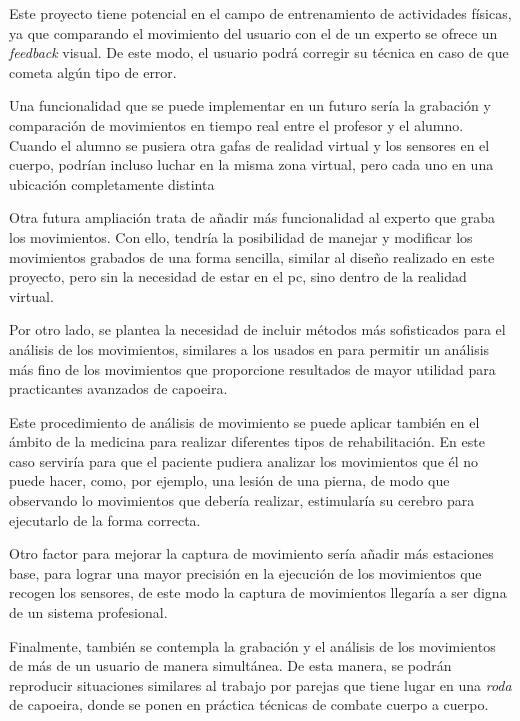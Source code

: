 Este proyecto tiene potencial en el campo de entrenamiento de actividades físicas, ya que comparando el movimiento del usuario con el de un experto se ofrece un \textit{feedback} visual. De este modo, el usuario podrá corregir su técnica en caso de que cometa algún tipo de error. 

Una funcionalidad que se puede implementar en un futuro sería la grabación y comparación de movimientos en tiempo real entre el profesor y el alumno. Cuando el alumno se pusiera otra gafas de realidad virtual y los sensores en el cuerpo, podrían incluso luchar en la misma zona virtual, pero cada uno en una ubicación completamente distinta

Otra futura ampliación trata de añadir más funcionalidad al experto que graba los movimientos. Con ello, tendría la posibilidad de manejar y modificar los movimientos grabados de una forma sencilla, similar al diseño realizado en este proyecto, pero sin la necesidad de estar en el pc, sino dentro de la realidad virtual.

Por otro lado, se plantea la necesidad de incluir métodos más sofisticados para el análisis de los movimientos, similares a los usados en \cite{Keerthy:Thesis:2012,Kyan:2015:ABD:2753829.2735951} para permitir un análisis más fino de los movimientos que proporcione resultados de mayor utilidad para practicantes avanzados de capoeira.

Este procedimiento de análisis de movimiento se puede aplicar también en el ámbito de la medicina para realizar diferentes tipos de rehabilitación. En este caso serviría para que el paciente pudiera analizar los movimientos que él no puede hacer, como, por ejemplo, una lesión de una pierna, de modo que observando lo movimientos que debería realizar, estimularía su cerebro para ejecutarlo de la forma correcta.

Otro factor para mejorar la captura de movimiento sería añadir más estaciones base, para lograr una mayor precisión en la ejecución de los movimientos que recogen los sensores, de este modo la captura de movimientos llegaría a ser digna de un sistema profesional.

Finalmente, también se contempla la grabación y el análisis de los movimientos de más de un usuario de manera simultánea. De esta manera, se podrán reproducir situaciones similares al trabajo por parejas que tiene lugar en una \textit{roda} de capoeira, donde se ponen en práctica técnicas de combate cuerpo a cuerpo.

